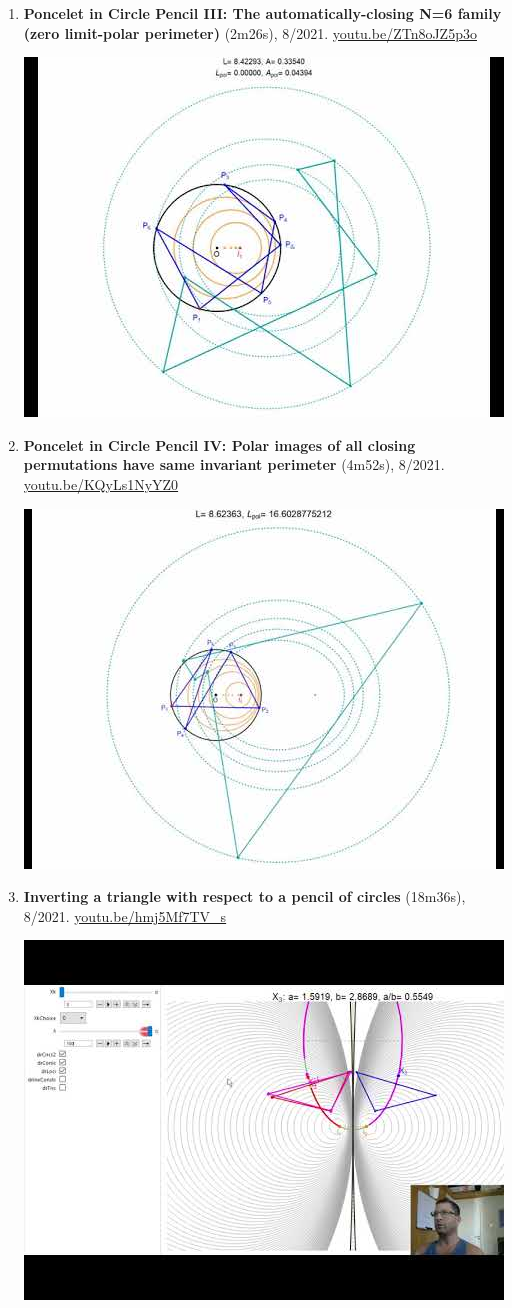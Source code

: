 \documentclass[12pt]{article}
\begin{document}
\begin{enumerate}[resume]
% 
\item \textbf{Poncelet in Circle Pencil III: The automatically-closing N=6 family (zero limit-polar perimeter)} (2m26s), 8/2021. \href{https://youtu.be/ZTn8oJZ5p3o}{\url{youtu.be/ZTn8oJZ5p3o}}
\begin{center}\includegraphics[width=.5\textwidth]{pics/ZTn8oJZ5p3o.jpg}\end{center}
% 
\item \textbf{Poncelet in Circle Pencil IV: Polar images of all closing permutations have same invariant perimeter} (4m52s), 8/2021. \href{https://youtu.be/KQyLs1NyYZ0}{\url{youtu.be/KQyLs1NyYZ0}}
\begin{center}\includegraphics[width=.5\textwidth]{pics/KQyLs1NyYZ0.jpg}\end{center}
% 
\item \textbf{Inverting a triangle with respect to a pencil of circles} (18m36s), 8/2021. \href{https://youtu.be/hmj5Mf7TV_s}{\url{youtu.be/hmj5Mf7TV\_s}}
\begin{center}\includegraphics[width=.5\textwidth]{pics/hmj5Mf7TV_s.jpg}\end{center}
% 
\end{enumerate}
\end{document}
